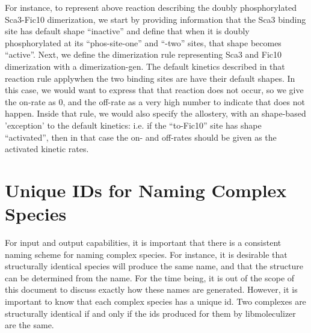For instance, to represent above reaction describing the doubly
phosphorylated Sca3-Fic10 dimerization, we start by providing
information that the Sca3 binding site has default shape ``inactive''
and define that when it is doubly phosphorylated at its
``phos-site-one'' and ``-two'' sites, that shape becomes ``active''.
Next, we define the dimerization rule representing Sca3 and Fic10
dimerization with a dimerization-gen.  The default kinetics described
in that reaction rule applywhen the two binding sites are have their
default shapes.  In this case, we would want to express that that
reaction does not occur, so we give the on-rate as 0, and the off-rate
as a very high number to indicate that does not happen.  Inside that
rule, we would also specify the allostery, with an shape-based
'exception' to the default kinetics: i.e. if the ``to-Fic10'' site has
shape ``activated'', then in that case the on- and off-rates should be
given as the activated kinetic rates.  


\section{Unique IDs for Naming Complex Species}
 For input and output capabilities, it is important that there is a
 consistent naming scheme for naming complex species.  For instance,
 it is desirable that structurally identical species will produce the
 same name, and that the structure can be determined from the name.
 For the time being, it is out of the scope of this document to
 discuss exactly how these names are generated.  However, it is
 important to know that each complex species has a unique id.  Two
 complexes are structurally identical if and only if the ids produced
 for them by libmoleculizer are the same.  